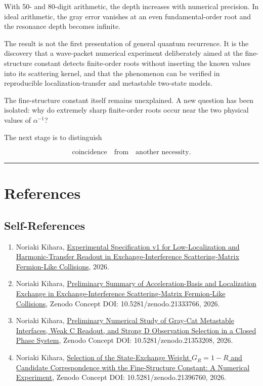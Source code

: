 \documentclass[
  10pt,
  a4paper,
]{article}
\providecommand{\tightlist}{%
  \setlength{\itemsep}{0pt}\setlength{\parskip}{0pt}}
\begin{document}
With 50- and 80-digit arithmetic, the depth increases with numerical
precision. In ideal arithmetic, the gray error vanishes at an even
fundamental-order root and the resonance depth becomes infinite.

The result is not the first presentation of general quantum recurrence.
It is the discovery that a wave-packet numerical experiment deliberately
aimed at the fine-structure constant detects finite-order roots without
inserting the known values into its scattering kernel, and that the
phenomenon can be verified in reproducible localization-transfer and
metastable two-state models.

The fine-structure constant itself remains unexplained. A new question
has been isolated: why do extremely sharp finite-order roots occur near
the two physical values of \(\alpha^{-1}\)?

The next stage is to distinguish

\[
\text{coincidence}
\quad\text{from}\quad
\text{another necessity}.
\]

\begin{center}\rule{0.5\linewidth}{0.5pt}\end{center}

\section{References}\label{references}

\subsection{Self-References}\label{self-references}

\begin{enumerate}
\def\labelenumi{\arabic{enumi}.}
\tightlist
\item
  Noriaki Kihara,
  \href{../20260713/交換干渉散乱行列フェルミオン的衝突における低局在性・倍音移乗読出し実験仕様書\%20v1.md}{Experimental
  Specification v1 for Low-Localization and Harmonic-Transfer Readout in
  Exchange-Interference Scattering-Matrix Fermion-Like Collisions},
  2026.
\item
  Noriaki Kihara,
  \href{../20260713/exchange_scattering_matrix_fermionic_localization_exchange_preliminary_summary_en.md}{Preliminary
  Summary of Acceleration-Basis and Localization Exchange in
  Exchange-Interference Scattering-Matrix Fermion-Like Collisions},
  Zenodo Concept DOI: 10.5281/zenodo.21333766, 2026.
\item
  Noriaki Kihara,
  \href{../20260714/gray_cat_metastable_observation_preliminary_summary_en.md}{Preliminary
  Numerical Study of Gray-Cat Metastable Interfaces, Weak C Readout, and
  Strong D Observation Selection in a Closed Phase System}, Zenodo
  Concept DOI: 10.5281/zenodo.21353208, 2026.
\item
  Noriaki Kihara,
  \href{../20260715/exchange_weight_alpha_correspondence_numerical_experiment_en.md}{Selection
  of the State-Exchange Weight \(G_R=1-R\) and Candidate Correspondence
  with the Fine-Structure Constant: A Numerical Experiment}, Zenodo
  Concept DOI: 10.5281/zenodo.21396760, 2026.
\end{enumerate}
\end{document}
